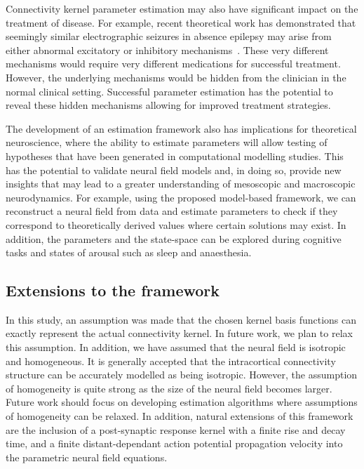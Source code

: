 \documentclass[12pt]{iopart}
\begin{document}
Connectivity kernel parameter estimation may also have significant impact on the treatment of disease. For example, recent theoretical work has demonstrated that seemingly similar electrographic seizures in absence epilepsy may arise from either abnormal excitatory or inhibitory mechanisms~\cite{Marten2009}. These very different mechanisms would require very different medications for successful treatment. However, the underlying mechanisms would be hidden from the clinician in the normal clinical setting. Successful parameter estimation has the potential to reveal these hidden mechanisms allowing for improved treatment strategies. 

The development of an estimation framework also has implications for theoretical neuroscience, where the ability to estimate parameters will allow testing of hypotheses that have been generated in computational modelling studies. This has the potential to validate neural field models and, in doing so, provide new insights that may lead to a greater understanding of mesoscopic and macroscopic neurodynamics. For example, using the proposed model-based framework, we can reconstruct a neural field from data and estimate parameters to check if they correspond to theoretically derived values where certain solutions may exist. In addition, the parameters and the state-space can be explored during cognitive tasks and states of arousal such as sleep and anaesthesia. 

\subsection{Extensions to the framework}

In this study, an assumption was made that the chosen kernel basis functions can exactly represent the actual connectivity kernel. In future work, we plan to relax this assumption. In addition, we have assumed that the neural field is isotropic and homogeneous. It is generally accepted that the intracortical connectivity structure can be accurately modelled as being isotropic. However, the assumption of homogeneity is quite strong as the size of the neural field becomes larger. Future work should focus on developing estimation algorithms where assumptions of homogeneity can be relaxed. In addition, natural extensions of this framework are the inclusion of a post-synaptic response kernel with a finite rise and decay time, and a finite distant-dependant action potential propagation velocity into the parametric neural field equations.
\end{document}
